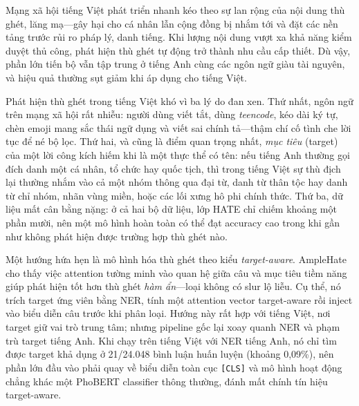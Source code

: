\documentclass[11pt]{article}
\begin{document}
Mạng xã hội tiếng Việt phát triển nhanh kéo theo sự lan rộng của nội dung thù ghét, lăng mạ---gây hại cho cá nhân lẫn cộng đồng bị nhắm tới và đặt các nền tảng trước rủi ro pháp lý, danh tiếng. Khi lượng nội dung vượt xa khả năng kiểm duyệt thủ công, phát hiện thù ghét tự động trở thành nhu cầu cấp thiết. Dù vậy, phần lớn tiến bộ vẫn tập trung ở tiếng Anh cùng các ngôn ngữ giàu tài nguyên, và hiệu quả thường sụt giảm khi áp dụng cho tiếng Việt.

Phát hiện thù ghét trong tiếng Việt khó vì ba lý do đan xen. Thứ nhất, ngôn ngữ trên mạng xã hội rất nhiễu: người dùng viết tắt, dùng \emph{teencode}, kéo dài ký tự, chèn emoji mang sắc thái ngữ dụng và viết sai chính tả---thậm chí cố tình che lời tục để né bộ lọc. Thứ hai, và cũng là điểm quan trọng nhất, \emph{mục tiêu} (target) của một lời công kích hiếm khi là một thực thể có tên: nếu tiếng Anh thường gọi đích danh một cá nhân, tổ chức hay quốc tịch, thì trong tiếng Việt sự thù địch lại thường nhắm vào cả một nhóm thông qua đại từ, danh từ thân tộc hay danh từ chỉ nhóm, nhãn vùng miền, hoặc các lối xưng hô phi chính thức. Thứ ba, dữ liệu mất cân bằng nặng: ở cả hai bộ dữ liệu, lớp HATE chỉ chiếm khoảng một phần mười, nên một mô hình hoàn toàn có thể đạt accuracy cao trong khi gần như không phát hiện được trường hợp thù ghét nào.

Một hướng hứa hẹn là mô hình hóa thù ghét theo kiểu \emph{target-aware}. AmpleHate \citep{amplehate} cho thấy việc attention tường minh vào quan hệ giữa câu và mục tiêu tiềm năng giúp phát hiện tốt hơn thù ghét \emph{hàm ẩn}---loại không có slur lộ liễu. Cụ thể, nó trích target ứng viên bằng NER, tính một attention vector target-aware rồi inject vào biểu diễn câu trước khi phân loại. Hướng này rất hợp với tiếng Việt, nơi target giữ vai trò trung tâm; nhưng pipeline gốc lại xoay quanh NER và phạm trù target tiếng Anh. Khi chạy trên tiếng Việt với NER tiếng Anh, nó chỉ tìm được target khả dụng ở 21/24{.}048 bình luận huấn luyện (khoảng 0,09\%), nên phần lớn đầu vào phải quay về biểu diễn toàn cục \texttt{[CLS]} và mô hình hoạt động chẳng khác một PhoBERT classifier thông thường, đánh mất chính tín hiệu target-aware.
\end{document}
